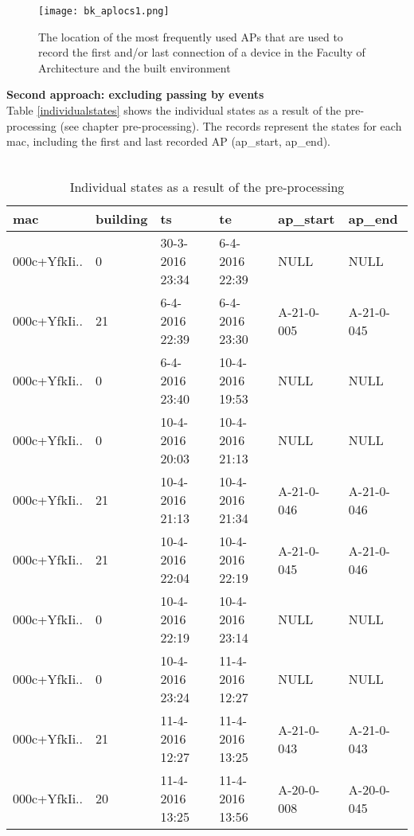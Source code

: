 \begin{figure}[H]
	\centering
	\texttt{[image: bk\_aplocs1.png]}
	\captionsetup{justification=centering}
	\caption{The location of the most frequently used APs that are used to record the first and/or last connection of a device in the Faculty of Architecture and the built environment}
	\label{firstapproach_map}
\end{figure}
\textbf{Second approach: excluding passing by events}\\
Table \autoref{individualstates} shows the individual states as a result of the pre-processing (see chapter pre-processing). The records represent the states for each mac, including the first and last recorded AP (ap\_start, ap\_end). \\\\
\begin{table}[H]
	\centering
	\captionsetup{justification=centering}
	\caption{Individual states as a result of the pre-processing}
	\label{individualstates}
	\begin{tabular}{@{}llllll@{}}
		\toprule
		\textbf{mac} & \textbf{building} & \textbf{ts}     & \textbf{te}     & \textbf{ap\_start} & \textbf{ap\_end} \\ \midrule
		000c+YfkIi.. & 0                 & 30-3-2016 23:34 & 6-4-2016 22:39  & NULL               & NULL             \\
		000c+YfkIi.. & 21                & 6-4-2016 22:39  & 6-4-2016 23:30  & A-21-0-005         & A-21-0-045       \\
		000c+YfkIi.. & 0                 & 6-4-2016 23:40  & 10-4-2016 19:53 & NULL               & NULL             \\
		000c+YfkIi.. & 0                 & 10-4-2016 20:03 & 10-4-2016 21:13 & NULL               & NULL             \\
		000c+YfkIi.. & 21                & 10-4-2016 21:13 & 10-4-2016 21:34 & A-21-0-046         & A-21-0-046       \\
		000c+YfkIi.. & 21                & 10-4-2016 22:04 & 10-4-2016 22:19 & A-21-0-045         & A-21-0-046       \\
		000c+YfkIi.. & 0                 & 10-4-2016 22:19 & 10-4-2016 23:14 & NULL               & NULL             \\
		000c+YfkIi.. & 0                 & 10-4-2016 23:24 & 11-4-2016 12:27 & NULL               & NULL             \\
		000c+YfkIi.. & 21                & 11-4-2016 12:27 & 11-4-2016 13:25 & A-21-0-043         & A-21-0-043       \\
		000c+YfkIi.. & 20                & 11-4-2016 13:25 & 11-4-2016 13:56 & A-20-0-008         & A-20-0-045       \\ \bottomrule
	\end{tabular}
\end{table}
